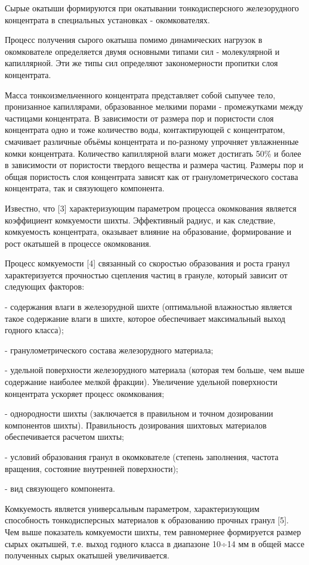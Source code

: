 Сырые окатыши формируются при окатывании тонкодисперсного железорудного
концентрата в специальных установках - окомкователях.

Процесс получения сырого окатыша помимо динамических нагрузок в
окомкователе определяется двумя основными типами сил - молекулярной и
капиллярной. Эти же типы сил определяют закономерности пропитки слоя
концентрата.

Масса тонкоизмельченного концентрата представляет собой сыпучее тело,
пронизанное капиллярами, образованное мелкими порами - промежутками
между частицами концентрата. В зависимости от размера пор и пористости
слоя концентрата одно и тоже количество воды, контактирующей с
концентратом, смачивает различные объёмы концентрата и по-разному
упрочняет увлажненные комки концентрата. Количество капиллярной влаги
может достигать 50\% и более в зависимости от пористости твердого
вещества и размера частиц. Размеры пор и общая пористость слоя
концентрата зависят как от гранулометрического состава концентрата, так
и связующего компонента.

Известно, что {[}3{]} характеризующим параметром процесса окомкования
является коэффициент комкуемости шихты. Эффективный радиус, и как
следствие, комкуемость концентрата, оказывает влияние на образование,
формирование и рост окатышей в процессе окомкования.

Процесс комкуемости {[}4{]} связанный со скоростью образования и роста
гранул характеризуется прочностью сцепления частиц в грануле, который
зависит от следующих факторов:

- содержания влаги в железорудной шихте (оптимальной влажностью является
такое содержание влаги в шихте, которое обеспечивает максимальный выход
годного класса);

- гранулометрического состава железорудного материала;

- удельной поверхности железорудного материала (которая тем больше, чем
выше содержание наиболее мелкой фракции). Увеличение удельной
поверхности концентрата ускоряет процесс окомкования;

- однородности шихты (заключается в правильном и точном дозировании
компонентов шихты). Правильность дозирования шихтовых материалов
обеспечивается расчетом шихты;

- условий образования гранул в окомкователе (степень заполнения, частота
вращения, состояние внутренней поверхности);

- вид связующего компонента.

Комкуемость является универсальным параметром, характеризующим
способность тонкодисперсных материалов к образованию прочных гранул
{[}5{]}. Чем выше показатель комкуемости шихты, тем равномернее
формируется размер сырых окатышей, т.е. выход годного класса в диапазоне
10÷14 мм в общей массе полученных сырых окатышей увеличивается.

